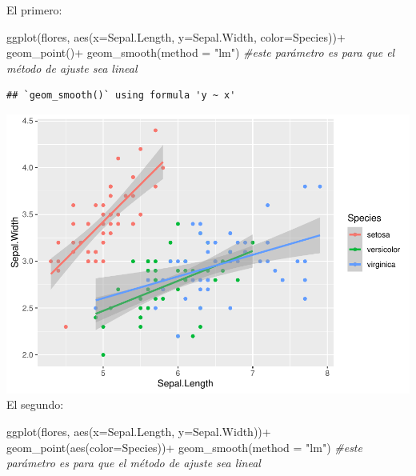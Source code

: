 \documentclass[
]{book}
\newenvironment{Shaded}{\begin{snugshade}}{\end{snugshade}}
\newcommand{\AttributeTok}[1]{\textcolor[rgb]{0.77,0.63,0.00}{#1}}
\newcommand{\CommentTok}[1]{\textcolor[rgb]{0.56,0.35,0.01}{\textit{#1}}}
\newcommand{\FunctionTok}[1]{\textcolor[rgb]{0.00,0.00,0.00}{#1}}
\newcommand{\NormalTok}[1]{#1}
\newcommand{\SpecialCharTok}[1]{\textcolor[rgb]{0.00,0.00,0.00}{#1}}
\newcommand{\StringTok}[1]{\textcolor[rgb]{0.31,0.60,0.02}{#1}}
\begin{document}
El primero:

\begin{Shaded}
\begin{Highlighting}[]
\FunctionTok{ggplot}\NormalTok{(flores, }\FunctionTok{aes}\NormalTok{(}\AttributeTok{x=}\NormalTok{Sepal.Length, }\AttributeTok{y=}\NormalTok{Sepal.Width, }\AttributeTok{color=}\NormalTok{Species))}\SpecialCharTok{+}
  \FunctionTok{geom\_point}\NormalTok{()}\SpecialCharTok{+}
  \FunctionTok{geom\_smooth}\NormalTok{(}\AttributeTok{method =} \StringTok{"lm"}\NormalTok{) }\CommentTok{\#este parámetro es para que el método de ajuste sea lineal}
\end{Highlighting}
\end{Shaded}

\begin{verbatim}
## `geom_smooth()` using formula 'y ~ x'
\end{verbatim}

\includegraphics{Esatadistica_en_R_files/figure-latex/unnamed-chunk-150-1.pdf}
El segundo:

\begin{Shaded}
\begin{Highlighting}[]
\FunctionTok{ggplot}\NormalTok{(flores, }\FunctionTok{aes}\NormalTok{(}\AttributeTok{x=}\NormalTok{Sepal.Length, }\AttributeTok{y=}\NormalTok{Sepal.Width))}\SpecialCharTok{+}
  \FunctionTok{geom\_point}\NormalTok{(}\FunctionTok{aes}\NormalTok{(}\AttributeTok{color=}\NormalTok{Species))}\SpecialCharTok{+}
  \FunctionTok{geom\_smooth}\NormalTok{(}\AttributeTok{method =} \StringTok{"lm"}\NormalTok{) }\CommentTok{\#este parámetro es para que el método de ajuste sea lineal}
\end{Highlighting}
\end{Shaded}
\end{document}
